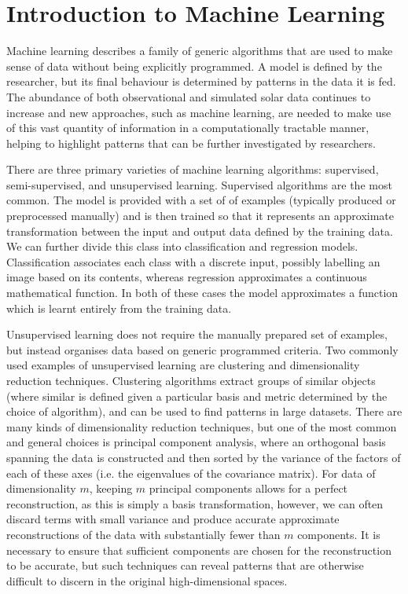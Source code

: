 \section{Introduction to Machine Learning}

Machine learning describes a family of generic algorithms that are used to make sense of data without being explicitly programmed.
A model is defined by the researcher, but its final behaviour is determined by patterns in the data it is fed.
The abundance of both observational and simulated solar data continues to increase and new approaches, such as machine learning, are needed to make use of this vast quantity of information in a computationally tractable manner, helping to highlight patterns that can be further investigated by researchers.

There are three primary varieties of machine learning algorithms: supervised, semi-supervised, and unsupervised learning.
Supervised algorithms are the most common.
The model is provided with a set of of examples (typically produced or preprocessed manually) and is then trained so that it represents an approximate transformation between the input and output data defined by the training data.
We can further divide this class into classification and regression models.
Classification associates each class with a discrete input, possibly labelling an image based on its contents, whereas regression approximates a continuous mathematical function.
In both of these cases the model approximates a function which is learnt entirely from the training data.

Unsupervised learning does not require the manually prepared set of examples, but instead organises data based on generic programmed criteria.
Two commonly used examples of unsupervised learning are clustering and dimensionality reduction techniques.
Clustering algorithms extract groups of similar objects (where similar is defined given a particular basis and metric determined by the choice of algorithm), and can be used to find patterns in large datasets.
There are many kinds of dimensionality reduction techniques, but one of the most common and general choices is principal component analysis, where an orthogonal basis spanning the data is constructed and then sorted by the variance of the factors of each of these axes (i.e. the eigenvalues of the covariance matrix).
For data of dimensionality $m$, keeping $m$ principal components allows for a perfect reconstruction, as this is simply a basis transformation, however, we can often discard terms with small variance and produce accurate approximate reconstructions of the data with substantially fewer than $m$ components.
It is necessary to ensure that sufficient components are chosen for the reconstruction to be accurate, but such techniques can reveal patterns that are otherwise difficult to discern in the original high-dimensional spaces.

